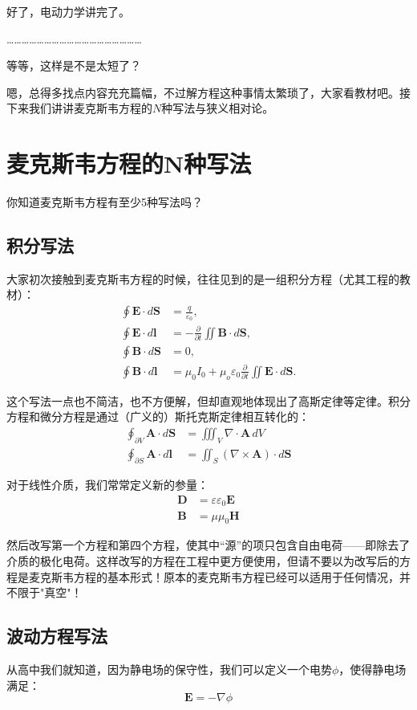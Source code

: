 \documentclass{ctexart}
\begin{document}
好了，电动力学讲完了。

………………………………………………

等等，这样是不是太短了？

嗯，总得多找点内容充充篇幅，不过解方程这种事情太繁琐了，大家看教材吧。接下来我们讲讲麦克斯韦方程的$N$种写法与狭义相对论。

\section{麦克斯韦方程的N种写法}
你知道麦克斯韦方程有至少5种写法吗？

\subsection{积分写法}
大家初次接触到麦克斯韦方程的时候，往往见到的是一组积分方程（尤其工程的教材）：
\begin{align}
\oint \bm{E}\cdot d\bm{S}&=\frac{q}{\varepsilon_0}, \\
\oint \bm{E}\cdot d\bm{l}&=-\frac{\partial}{\partial t}\iint \bm{B}\cdot d\bm{S},\\
\oint \bm{B}\cdot d\bm{S}&=0, \\
\oint \bm{B}\cdot d\bm{l}&=\mu_0 I_0+\mu_o\varepsilon_0 \frac{\partial}{\partial t}\iint\bm{E}\cdot d\bm{S}.
\end{align}

这个写法一点也不简洁，也不方便解，但却直观地体现出了高斯定律等定律。积分方程和微分方程是通过（广义的）斯托克斯定律相互转化的：
\begin{align}
\oint_{\partial V} \bm{A}\cdot d\bm{S}&=\iiint_V \nabla\cdot\bm{A}\,dV \\
\oint_{\partial S}\bm{A}\cdot d\bm{l}&=\iint_S(\nabla\times\bm{A})\cdot d\bm{S}
\end{align}

对于线性介质，我们常常定义新的参量：
\begin{align}
\bm{D}&=\varepsilon\varepsilon_0\bm{E}\\
\bm{B}&=\mu\mu_0\bm{H}
\end{align}

然后改写第一个方程和第四个方程，使其中“源”的项只包含自由电荷——即除去了介质的极化电荷。这样改写的方程在工程中更方便使用，但请不要以为改写后的方程是麦克斯韦方程的基本形式！原本的麦克斯韦方程已经可以适用于任何情况，并不限于"真空"！

\subsection{波动方程写法}
从高中我们就知道，因为静电场的保守性，我们可以定义一个电势$\phi$，使得静电场满足：
\begin{equation}
\bm{E}=-\nabla\phi
\end{equation}
\end{document}
